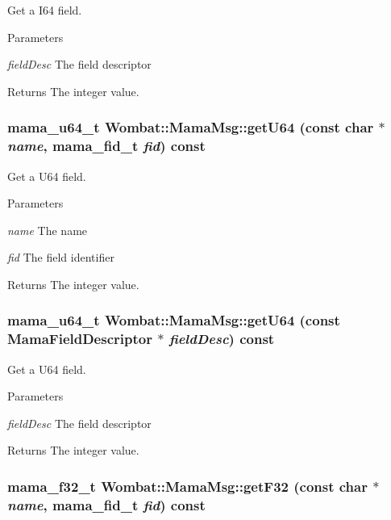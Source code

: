 Get a I64 field. 
\begin{DoxyParams}{Parameters}
\item[{\em fieldDesc}]The field descriptor \end{DoxyParams}
\begin{DoxyReturn}{Returns}
The integer value. 
\end{DoxyReturn}
\hypertarget{classWombat_1_1MamaMsg_a76f37c2c3c2cfafddda31c75137c54af}{
\subsubsection[{getU64}]{\setlength{\rightskip}{0pt plus 5cm}mama\_\-u64\_\-t Wombat::MamaMsg::getU64 (const char $\ast$ {\em name}, \/  mama\_\-fid\_\-t {\em fid}) const}}
\label{classWombat_1_1MamaMsg_a76f37c2c3c2cfafddda31c75137c54af}


Get a U64 field. 
\begin{DoxyParams}{Parameters}
\item[{\em name}]The name \item[{\em fid}]The field identifier \end{DoxyParams}
\begin{DoxyReturn}{Returns}
The integer value. 
\end{DoxyReturn}
\hypertarget{classWombat_1_1MamaMsg_a0a09c24df619df060452d4e40b370ef0}{
\subsubsection[{getU64}]{\setlength{\rightskip}{0pt plus 5cm}mama\_\-u64\_\-t Wombat::MamaMsg::getU64 (const {\bf MamaFieldDescriptor} $\ast$ {\em fieldDesc}) const}}
\label{classWombat_1_1MamaMsg_a0a09c24df619df060452d4e40b370ef0}


Get a U64 field. 
\begin{DoxyParams}{Parameters}
\item[{\em fieldDesc}]The field descriptor \end{DoxyParams}
\begin{DoxyReturn}{Returns}
The integer value. 
\end{DoxyReturn}
\hypertarget{classWombat_1_1MamaMsg_a3c4c5a9d90fd6fd6e51d69a14505c28c}{
\subsubsection[{getF32}]{\setlength{\rightskip}{0pt plus 5cm}mama\_\-f32\_\-t Wombat::MamaMsg::getF32 (const char $\ast$ {\em name}, \/  mama\_\-fid\_\-t {\em fid}) const}}
\label{classWombat_1_1MamaMsg_a3c4c5a9d90fd6fd6e51d69a14505c28c}


